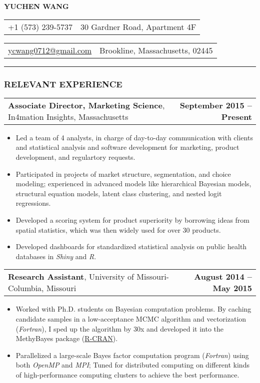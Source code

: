 \documentclass[11pt]{article}
\makeatletter
\newcommand{\headerrow}[2]
{\begin{tabular*}{\linewidth}{l@{\extracolsep{\fill}}r}
	#1 & #2 \\
\end{tabular*}
}
\makeatother
\begin{document}
\begin{center}
	\huge\textbf{YUCHEN WANG}
\end{center}
\noindent\headerrow{+1 (573) 239-5737}{30 Gardner Road, Apartment 4F}
\headerrow{\href{mailto:ycwang0712@gmail.com}{ycwang0712@gmail.com}}{Brookline, Massachusetts, 02445}

\vspace{-.8em}
\hrule


\subsubsection*{\centering RELEVANT EXPERIENCE}
\vspace{-.3em}


\headerrow
{\textbf{Associate Director, Marketing Science}, In4mation Insights, Massachusetts}
{\textbf{September 2015 – Present}}
\begin{itemize}
		\item Led a team of 4 analysts, in charge of day-to-day communication with clients and statistical analysis and software development for marketing, product development, and regulartory requests.
		\item Participated in projects of market structure, segmentation, and choice modeling; experienced in advanced models like hierarchical Bayesian models, structural equation models, latent class clustering, and nested logit regressions.
    \item Developed a scoring system for product superiority by borrowing ideas from spatial statistics, which was then widely used for over 30 products.
    \item Developed dashboards for standardized statistical analysis on public health databases in \emph{Shiny} and \emph{R}.
\end{itemize}



\noindent\headerrow
{\textbf{Research Assistant}, University of Missouri-Columbia, Missouri}
{\textbf{August 2014 – May 2015}}
\noindent\begin{itemize}
    \item Worked with Ph.D. students on Bayesian computation problems. By caching candidate samples in a low-acceptance MCMC algorithm and vectorization (\emph{Fortran}), I sped up the algorithm by 30x and developed it into the MethyBayes package (\href{https://cran.rstudio.com/web/packages/MethyBayes/index.html}{R-CRAN}).
    \item Parallelized a large-scale Bayes factor computation program (\emph{Fortran}) using both \emph{OpenMP} and \emph{MPI}; Tuned for distributed computing on different kinds of high-performance computing clusters to achieve the best performance.
\end{itemize}
\end{document}

